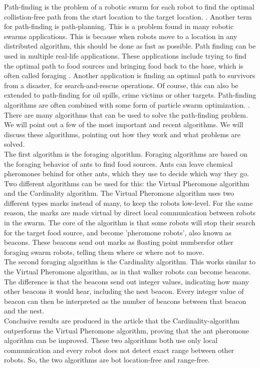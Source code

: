 
Path-finding is the problem of a robotic swarm for each robot to find the optimal collistion-free path from the start location to the target location. \cite{qin2004path}.
Another term for path-finding is path-planning. 
This is a problem found in many robotic swarms applications.
This is because when robots move to a location in any distributed algorithm, this should be done as fast as possible. 
Path finding can be used in multiple real-life applications.
These applications include trying to find the optimal path to food sources and bringing food back to the base, which is often called foraging \cite{hoff2010two}.
Another application is finding an optimal path to survivors from a disaster, for search-and-rescue operations.
Of course, this can also be extended to path-finding for oil spills, crime victims or other targets.\cite{pugh2007inspiring} 
Path-finding algorithms are often combined with some form of particle swarm optimization. \cite{poli2007particle}. \\

There are many algorithms that can be used to solve the path-finding problem. 
We will point out a few of the most important and recent algorithms. \cite{hoff2010two} \cite{Bhattacharjee} \cite{Jung} \cite{Kala}
We will discuss these algorithms, pointing out how they work and what problems are solved. \\

The first algorithm is the foraging algorithm. \cite{hoff2010two}
Foraging algorithms are based on the foraging behavior of ants to find food sources. 
Ants can leave chemical pheromones behind for other ants, which they use to decide which way they go. 
Two different algorithms can be used for this: the Virtual Pheromone algorithm and the Cardinality algorithm.
The Virtual Pheromone algorithm uses two different types marks instead of many, to keep the robots low-level. 
For the same reason, the marks are made virtual by direct local communication between robots in the swarm.
The core of the algorithm is that some robots will stop their search for the target food source, and become 'pheromone robots', also known as beacons.
These beacons send out marks as floating point numbersfor other foraging swarm robots, telling them where or where not to move. \\
The second foraging algorithm is the Cardinality algorithm. 
This works similar to the Virtual Pheromone algorithm, as in that walker robots can become beacons. 
The difference is that the beacons send out integer values, indicating how many other beacons it would hear, including the nest beacon. 
Every integer value of beacon can then be interpreted as the number of beacons between that beacon and the nest. \\
Conclusive results are produced in the article that the Cardinality-algorithm outperforms the Virtual Pheromone algorithm, proving that the ant pheromone algorithm can be improved.
These two algorithms both use only local communication and every robot does not detect exact range between other robots.
So, the two algorithms are bot location-free and range-free. \\


